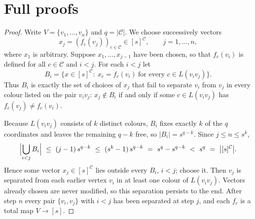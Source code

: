 \documentclass[11pt,a4paper]{article}
\theoremstyle{plain}
\theoremstyle{definition}
\theoremstyle{remark}
\newcommand{\cC}{\mathcal C}
\begin{document}
\appendix

\section{Full proofs}\label{app:proofs}

\label{pf:sep}
\lemsep*
\begin{proof}
Write $V=\{v_1,\dots,v_n\}$ and $q=|\cC|$. We choose successively vectors
\[
 x_j=(f_c(v_j))_{c\in\cC}\in[s]^{\cC},\qquad j=1,\dots,n,
\]
where $x_1$ is arbitrary. Suppose $x_1,\dots,x_{j-1}$ have been chosen, so that $f_c(v_i)$ is defined for all $c\in\cC$ and $i<j$. For each $i<j$ let
\[
 B_i=\bigl\{x\in[s]^{\cC}:\ x_c=f_c(v_i)\ \text{for every }c\in L(v_iv_j)\bigr\}.
\]
Thus $B_i$ is exactly the set of choices of $x_j$ that fail to separate $v_i$ from $v_j$ in every colour listed on the pair $v_iv_j$: $x_j\notin B_i$ if and only if some $c\in L(v_iv_j)$ has $f_c(v_j)\ne f_c(v_i)$.

Because $L(v_iv_j)$ consists of $k$ distinct colours, $B_i$ fixes exactly $k$ of the $q$ coordinates and leaves the remaining $q-k$ free, so $|B_i|=s^{q-k}$. Since $j\le n\le s^k$,
\[
 \Bigl|\bigcup_{i<j}B_i\Bigr|\ \le\ (j-1)\,s^{q-k}\ \le\ (s^k-1)\,s^{q-k}\ =\ s^q-s^{q-k}\ <\ s^q\ =\ \bigl|[s]^{\cC}\bigr|.
\]
Hence some vector $x_j\in[s]^{\cC}$ lies outside every $B_i$, $i<j$; choose it. Then $v_j$ is separated from each earlier vertex $v_i$ in at least one colour of $L(v_iv_j)$. Vectors already chosen are never modified, so this separation persists to the end. After step $n$ every pair $\{v_i,v_j\}$ with $i<j$ has been separated at step $j$, and each $f_c$ is a total map $V\to[s]$.
\end{proof}
\end{document}
